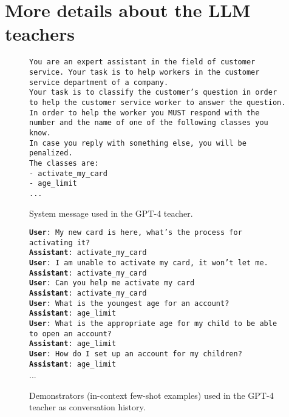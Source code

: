 \documentclass[11pt]{article}
\begin{document}
\section{More details about the LLM teachers}
\label{sec:prompt}

\begin{figure}[ht]
    \begin{minipage}{\columnwidth}
    {\small\texttt{You are an expert assistant in the field of customer service. Your task is to help workers in the customer service department of a company.\\Your task is to classify the customer's question in order to help the customer service worker to answer the question. In order to help the worker you MUST respond with the number and the name of one of the following classes you know.\\In case you reply with something else, you will be penalized.\\The classes are:\\- activate\_my\_card\\- age\_limit\\...}}
    \end{minipage}
    \caption{System message used in the GPT-4 teacher.}
    \label{fig:gpt-system}
    \vspace{-1em}
\end{figure}

\begin{figure}[ht]
    \begin{minipage}{\columnwidth}
    {\small\texttt{\textbf{User}: My new card is here, what's the process for activating it?}}\\
    {\small\texttt{\textbf{Assistant}: activate\_my\_card}}\\{\small\texttt{\textbf{User}: I am unable to activate my card, it won't let me.}}\\
    {\small\texttt{\textbf{Assistant}: activate\_my\_card}}\\{\small\texttt{\textbf{User}: Can you help me activate my card}}\\
    {\small\texttt{\textbf{Assistant}: activate\_my\_card}}\\
    {\small\texttt{\textbf{User}: What is the youngest age for an account?}}\\
    {\small\texttt{\textbf{Assistant}: age\_limit}}\\{\small\texttt{\textbf{User}: What is the appropriate age for my child to be able to open an account?}}\\
    {\small\texttt{\textbf{Assistant}: age\_limit}}\\{\small\texttt{\textbf{User}: How do I set up an account for my children?}}\\
    {\small\texttt{\textbf{Assistant}: age\_limit}}\\
    ...
    \end{minipage}
    \caption{Demonstrators (in-context few-shot examples) used in the GPT-4 teacher as conversation history.}
    \label{fig:gpt-history}
\end{figure}
\end{document}
